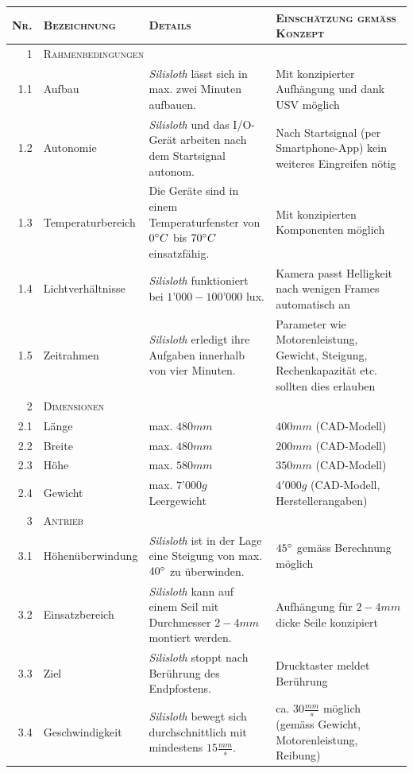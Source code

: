 {\footnotesize
\begin{longtable}{|r|p{2cm}|p{5cm}|p{5.5cm}|}
\hline
\textsc{Nr.} & \textsc{Bezeichnung} & \textsc{Details} & \textsc{Einschätzung gemäss Konzept} \\
\hline
    \textsc{1} & \multicolumn{3}{l|}{\textsc{Rahmenbedingungen}} \\
    \hline
    1.1 & Aufbau  & \textit{Silisloth} lässt sich in max. zwei Minuten aufbauen. & Mit konzipierter Aufhängung und dank USV möglich \\
    1.2 & Autonomie & \textit{Silisloth} und das I/O-Gerät arbeiten nach dem Startsignal autonom. & Nach Startsignal (per Smartphone-App) kein weiteres Eingreifen nötig \\
    1.3 & Temperaturbe\-reich & Die Geräte sind in einem Temperaturfenster von $0\degree C$ bis $70\degree C$ einsatzfähig. & Mit konzipierten Komponenten möglich \\
1.4 & Lichtverhältnisse & \textit{Silisloth} funktioniert bei $1’000-100’000$ lux. & Kamera passt Helligkeit nach wenigen Frames automatisch an \\
    1.5 & Zeitrahmen & \textit{Silisloth} erledigt ihre Aufgaben innerhalb von vier Minuten. & Parameter wie Motorenleistung, Gewicht, Steigung, Rechenkapazität etc. sollten dies erlauben \\
    \hline
    \textsc{2} & \multicolumn{3}{l|}{\textsc{Dimensionen}} \\
    \hline
    2.1 & Länge & max. $480mm$ & $400mm$ (CAD-Modell) \\
    2.2 & Breite & max. $480mm$ & $200mm$ (CAD-Modell) \\
    2.3 & Höhe & max. $580mm$ & $350mm$ (CAD-Modell) \\
    2.4 & Gewicht & max. $7’000g$ Leergewicht & $4'000g$ (CAD-Modell, Herstellerangaben) \\
    \hline
    \textsc{3} & \multicolumn{3}{l|}{\textsc{Antrieb}} \\
    \hline
    3.1 & Höhenüberwin\-dung & \textit{Silisloth} ist in der Lage eine Steigung von max. $40\degree$ zu überwinden. & $45\degree$ gemäss Berechnung möglich  \\
    3.2 & Einsatzbereich & \textit{Silisloth} kann auf einem Seil mit Durchmesser $2-4mm$ montiert werden. & Aufhängung für $2-4mm$ dicke Seile konzipiert \\
3.3 & Ziel & \textit{Silisloth} stoppt nach Berührung des Endpfostens. & Drucktaster meldet Berührung \\
    3.4 & Geschwindigkeit  & \textit{Silisloth} bewegt sich durchschnittlich mit mindestens $15\frac{mm}{s}$. & ca. $30\frac{mm}{s}$ möglich (gemäss Gewicht, Motorenleistung, Reibung) \\

\end{longtable}}
